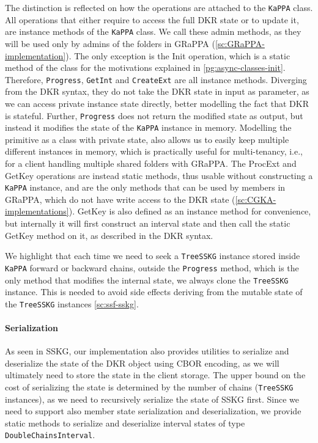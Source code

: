 The distinction is reflected on how the operations are attached
to the \texttt{KaPPA} class. All operations that either require
to access the full DKR state or to update it, are instance
methods of the \texttt{KaPPA} class. We call these admin methods,
as they will be used only by admins of the folders in GRaPPA (\cref{sc:GRaPPA-implementation}).
The only exception is the Init operation, which is a static method 
of the class for the motivations explained in \cref{pg:async-classes-init}.
Therefore, \texttt{Progress}, \texttt{GetInt} and \texttt{CreateExt} are all instance methods.
Diverging from the DKR syntax, they do not take the DKR state in input
as parameter, as we can access private instance state directly,
better modelling the fact that DKR is stateful.
Further, \texttt{Progress} does not return the modified state as output, 
but instead it modifies the state of the \texttt{KaPPA} instance in memory.
Modelling the primitive as a class with private state, also
allows us to easily keep multiple different instances
in memory, which is practically useful for multi-tenancy, i.e., 
for a client handling multiple shared folders with GRaPPA.
The ProcExt and GetKey operations are instead static methods,
thus usable without constructing a \texttt{KaPPA} instance,
and are the only methods that can be used by members in GRaPPA,
which do not have write access to the DKR state (\cref{sc:CGKA-implementations}).
GetKey is also defined as an instance method for convenience,
but internally it will first construct an interval state and
then call the static GetKey method on it, as described in the
DKR syntax.

We highlight that each time we need to seek a \texttt{TreeSSKG}
instance stored inside \texttt{KaPPA} forward or backward chains,
outside the \texttt{Progress} method, which is the only method
that modifies the internal state, we always clone the \texttt{TreeSSKG}
instance. This is needed to avoid side effects
deriving from the mutable state of the \texttt{TreeSSKG} instances
\cref{sc:ssf-sskg}. 

\paragraph{Serialization} As seen in SSKG, our implementation also provides utilities
to serialize and deserialize the state of the DKR object
using CBOR encoding, as we will ultimately need to
store the state in the client storage.
The upper bound on the cost of serializing the state is determined
by the number of chains (\texttt{TreeSSKG} instances),
as we need to recursively serialize the state of SSKG first.
Since we need to support also member state serialization and deserialization,
we provide static methods to serialize and deserialize interval
states of type \texttt{DoubleChainsInterval}.


